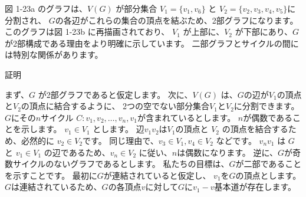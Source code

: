 図 1-23a のグラフは、$V(G)$ が部分集合 $V_1 = \{ v_1, v_6\} $ と $V_2 = \{ v_2, v_3, v_4, v_5\} $に分割され、
$G$の各辺がこれらの集合の頂点を結ぶため、2部グラフになります。このグラフは図 1-23b に再描画されており、
$V_1$ が上部に、$V_2$ が下部にあり、$G$ が2部構成である理由をより明確に示しています。
二部グラフとサイクルの間には特別な関係があります。

証明

まず、$G$ が2部グラフであると仮定します。 次に、$V(G)$ は、$G$の辺が$V_1$の頂点と$V_2$の頂点に結合するように、
2つの空でない部分集合$V_1$と$V_2$に分割できます。$G$にその$n$サイクル $C: v_1, v_2, \dots, v_n, v_1$が含まれているとします。 $n$が偶数であることを示します。 
$v_1 \in V_1$ とします。 辺$v_1v_2$は$V_1$の頂点と $V_2$ の頂点を結合するため、必然的に $v_2 \in V_2$です。
同じ理由で、$v_3 \in V_1, v_4 \in V_2$ などです。 $v_nv_1$ は $G$ と $v_1 \in V_1$ の辺であるため、$v_n \in V_2$ に従い、$n$は偶数になります。
逆に、$G$が奇数サイクルのないグラフであるとします。 私たちの目標は、$G$が二部であることを示すことです。 最初に$G$が連結されていると仮定し、
$v_1$を$G$の頂点とします。$G$は連結されているため、$G$の各頂点$v$に対して$G$に$v_1-v$基本道が存在します。